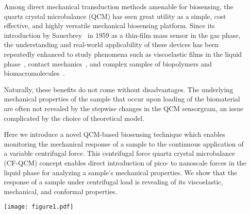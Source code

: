 \documentclass[floatfix,superscriptaddress,a4paper,twocolumn]{revtex4-1}
\let\oldsqrt\sqrt
\def\sqrt{\mathpalette\DHLhksqrt}
\def\DHLhksqrt#1#2{%
\setbox0=\hbox{$#1\oldsqrt{#2\,}$}\dimen0=\ht0
\advance\dimen0-0.2\ht0
\setbox2=\hbox{\vrule height\ht0 depth -\dimen0}%
{\box0\lower0.4pt\box2}}
\begin{document}
Among direct mechanical transduction methods amenable for biosensing, the
quartz crystal microbalance (QCM) has seen great utility as a simple, cost
effective, and highly versatile mechanical biosensing platform.  Since its
introduction by Sauerbrey~\cite{sauerbrey1959verwendung} in 1959 as a
thin-film mass sensor in the gas phase, the understanding and real-world
applicability of these devices has been repeatedly enhanced
to study phenomena such as viscoelastic films in the liquid
phase~\cite{kanazawa1985frequency}, contact
mechanics~\cite{johannsman2007contacts}, and complex samples of biopolymers
and biomacromolecules~\cite{marx2003quartz}.

Naturally, these benefits do not come without disadvantages. The
underlying mechanical properties of the sample that occur upon loading of
the biomaterial are often not revealed by the stepwise changes in the QCM
sensorgram, an issue complicated by the choice of theoretical model.

Here we introduce a novel QCM-based biosensing technique which enables
monitoring the mechanical response of a sample to the continuous
application of a variable centrifugal force.  This centrifugal force quartz
crystal microbalance (CF-QCM) concept enables direct introduction of pico-
to nanoscale forces in the liquid phase for analyzing a sample's mechanical
properties.  We show that the response of a sample under
centrifugal load is revealing of its viscoelastic, mechanical, and conformal
properties.
\begin{figure*}[ht]
\centering
\texttt{[image: figure1.pdf]}
\caption{Overview of the CF-QCM.  (a) Experimental setup.  A QCM and its driver are integrated into one
arm of a standard swinging bucket centrifuge.  Data acquisition is done
electrically through a tether and a centrally mounted slip ring.  When
spinning, centrifugal force is applied to a sample under assay. Here
$F_\mathrm{c} \equiv m \sqrt{a_\mathrm{c}^2 +a_\mathrm{g}^2}$, where
$a_\mathrm{c}=\omega^2 R$ and $a_\mathrm{g}$ are centripetal and gravitational
accelerations, respectively.  (b)
Example CF-QCM experiment with \SI{1}{\micro\meter} particles in water,
$N_\mathrm{L}=\SI{1.58e11}{\particle\per\meter\squared}$, in the
``loading'' configuration (inset).  The horizontal arrows indicate the
motion of the QCM's transverse shear mode.
The spin up to \SI{90}{g} in
loading configuration enhances the QCM frequency shift signal and allows
extraction of mechanical properties of the sample, as well as particle 
size. See text for details.
}
\label{fig:expsetup}
\end{figure*}
\end{document}
